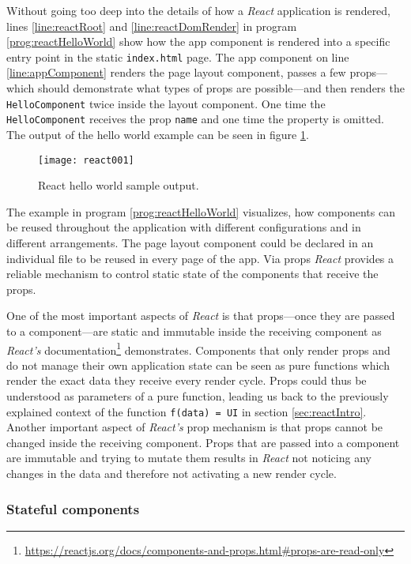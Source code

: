 Without going too deep into the details of how a \emph{React} application is rendered, lines \ref{line:reactRoot} and \ref{line:reactDomRender} in program \ref{prog:reactHelloWorld} show how the app component is rendered into a specific entry point in the static \texttt{index.html} page. The app component on line \ref{line:appComponent} renders the page layout component, passes a few props---which should demonstrate what types of props are possible---and then renders the \texttt{HelloComponent} twice inside the layout component. One time the \texttt{HelloComponent} receives the prop \texttt{name} and one time the property is omitted. The output of the hello world example can be seen in figure \ref{fig:reactHelloWorld}. 

\begin{figure}
  \centering
  \texttt{[image: react001]}
  \caption{React hello world sample output.}
  \label{fig:reactHelloWorld}
\end{figure}

The example in program \ref{prog:reactHelloWorld} visualizes, how components can be reused throughout the application with different configurations and in different arrangements. The page layout component could be declared in an individual file to be reused in every page of the app. Via props \emph{React} provides a reliable mechanism to control static state of the components that receive the props.

One of the most important aspects of \emph{React} is that props---once they are passed to a component---are static and immutable inside the receiving component as \emph{React's} documentation\footnote{\url{https://reactjs.org/docs/components-and-props.html\#props-are-read-only}} demonstrates. Components that only render props and do not manage their own application state can be seen as pure functions which render the exact data they receive every render cycle. Props could thus be understood as parameters of a pure function, leading us back to the previously explained context of the function \texttt{f(data) = UI} in section \ref{sec:reactIntro}. Another important aspect of \emph{React's} prop mechanism is that props cannot be changed inside the receiving component. Props that are passed into a component are immutable and trying to mutate them results in \emph{React} not noticing any changes in the data and therefore not activating a new render cycle.

\subsubsection{Stateful components}

